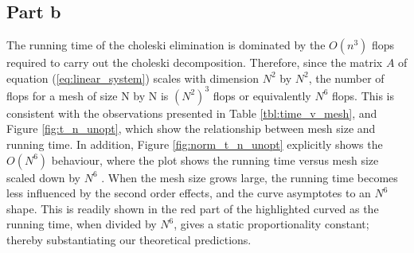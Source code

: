 \documentclass[11pt]{amsart}
\begin{document}
\subsection*{Part b} The running time of the choleski elimination is dominated by the $O(n^3)$ flops required to carry out the choleski decomposition. Therefore, since the matrix $A$ of equation (\ref{eq:linear_system}) scales with dimension $N^2$ by $N^2$, the number of flops for a mesh of size N by N is $(N^2)^3$ flops or equivalently $N^6$ flops. This is consistent with the observations presented in Table \ref{tbl:time_v_mesh}, and Figure \ref{fig:t_n_unopt}, which show the relationship between mesh size and running time. In addition, Figure \ref{fig:norm_t_n_unopt} explicitly shows the $O(N^6)$ behaviour, where the plot shows the running time versus mesh size scaled down by $N^6$ . When the mesh size grows large, the running time becomes less influenced by the second order effects, and the curve asymptotes to an $N^6$ shape. This is readily shown in the red part of the highlighted curved as the running time, when divided by $N^6$, gives a static proportionality constant; thereby substantiating our theoretical predictions.
\end{document}
